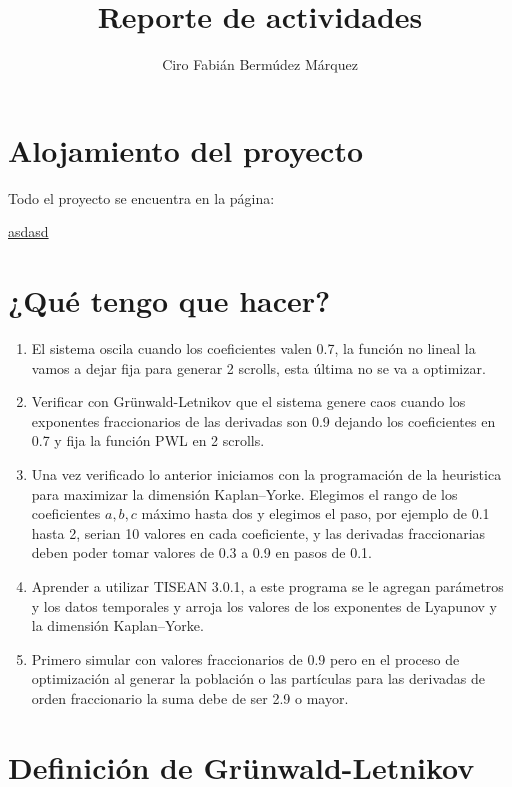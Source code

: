 \documentclass[10pt,a4paper]{article}
\author{Ciro Fabián Bermúdez Márquez}
\title{Reporte de actividades}
\begin{document}
\maketitle
	\section{Alojamiento del proyecto}
	Todo el proyecto se encuentra en la página:
	
	\begin{center}
		\url{asdasd}
	\end{center}
	\section{¿Qué tengo que hacer?}	
	
	\begin{enumerate}
		\item El sistema oscila cuando los coeficientes valen 0.7,  la función no lineal la vamos a dejar fija para generar 2 scrolls, esta última no se va a optimizar.
		
		\item Verificar con Grünwald-Letnikov que el sistema genere caos cuando los exponentes fraccionarios de las derivadas son 0.9 dejando los coeficientes en 0.7 y fija la función PWL en 2 scrolls. 
		
		\item Una vez verificado lo anterior iniciamos con la programación de la heuristica para maximizar la dimensión Kaplan–Yorke. Elegimos el rango de los coeficientes $a,b,c$ máximo hasta dos y elegimos el paso, por ejemplo de 0.1 hasta 2, serian 10 valores en cada coeficiente, y las derivadas fraccionarias deben poder tomar valores de 0.3 a 0.9 en pasos de 0.1.
		
		\item Aprender a utilizar TISEAN 3.0.1, a este programa se le agregan parámetros y los datos temporales y arroja los valores de los exponentes de Lyapunov y la dimensión Kaplan–Yorke.
	
		\item Primero simular con valores fraccionarios de 0.9 pero en el proceso de optimización al generar la población o las partículas para las derivadas de orden fraccionario la suma debe de ser 2.9 o mayor. 
	\end{enumerate}
	
			
	\section{Definición de Grünwald-Letnikov}
\end{document}
